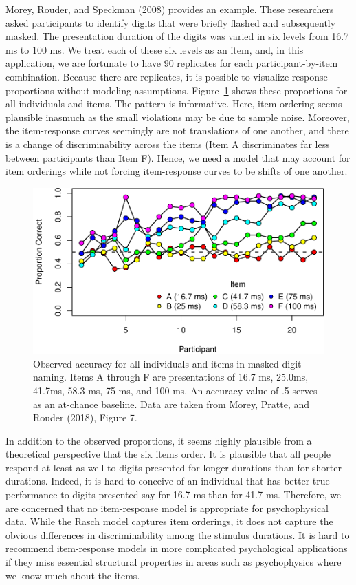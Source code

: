 \documentclass[english,,man]{apa6}
\begin{document}
Morey, Rouder, and Speckman (2008) provides an example. These researchers asked participants to identify digits that were briefly flashed and subsequently masked. The presentation duration of the digits was varied in six levels from 16.7 ms to 100 ms. We treat each of these six levels as an item, and, in this application, we are fortunate to have 90 replicates for each participant-by-item combination. Because there are replicates, it is possible to visualize response proportions without modeling assumptions. Figure~\ref{fig:sl2} shows these proportions for all individuals and items. The pattern is informative. Here, item ordering seems plausible inasmuch as the small violations may be due to sample noise. Moreover, the item-response curves seemingly are not translations of one another, and there is a change of discriminability across the items (Item A discriminates far less between participants than Item F). Hence, we need a model that may account for item orderings while not forcing item-response curves to be shifts of one another.

\begin{figure}
\centering
\includegraphics{p_files/figure-latex/sl2-1.pdf}
\caption{\label{fig:sl2}Observed accuracy for all individuals and items in masked digit naming. Items A through F are presentations of 16.7 ms, 25.0ms, 41.7ms, 58.3 ms, 75 ms, and 100 ms. An accuracy value of .5 serves as an at-chance baseline. Data are taken from Morey, Pratte, and Rouder (2018), Figure 7.}
\end{figure}

In addition to the observed proportions, it seems highly plausible from a theoretical perspective that the six items order. It is plausible that all people respond at least as well to digits presented for longer durations than for shorter durations. Indeed, it is hard to conceive of an individual that has better true performance to digits presented say for 16.7 ms than for 41.7 ms. Therefore, we are concerned that no item-response model is appropriate for psychophysical data. While the Rasch model captures item orderings, it does not capture the obvious differences in discriminability among the stimulus durations. It is hard to recommend item-response models in more complicated psychological applications if they miss essential structural properties in areas such as psychophysics where we know much about the items.
\end{document}
